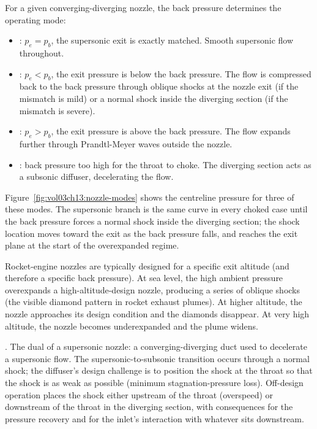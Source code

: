 

For a given converging-diverging nozzle, the back pressure
determines the operating mode:

\begin{itemize}[leftmargin=*]
  \item {}: $p_e = p_b$, the supersonic
    exit is exactly matched. Smooth supersonic flow throughout.
  \item {}: $p_e < p_b$, the exit pressure is
    below the back pressure. The flow is compressed back to the
    back pressure through oblique shocks at the nozzle exit (if
    the mismatch is mild) or a normal shock inside the diverging
    section (if the mismatch is severe).
  \item {}: $p_e > p_b$, the exit pressure is
    above the back pressure. The flow expands further through
    Prandtl-Meyer waves outside the nozzle.
  \item {}: back pressure too high for
    the throat to choke. The diverging section acts as a
    subsonic diffuser, decelerating the flow.
\end{itemize}



Figure~\ref{fig:vol03ch13:nozzle-modes} shows the centreline pressure
for three of these modes. The supersonic branch is the same curve in
every choked case until the back pressure forces a normal shock inside
the diverging section; the shock location moves toward the exit as the
back pressure falls, and reaches the exit plane at the start of the
overexpanded regime.

Rocket-engine nozzles are typically designed for a specific exit
altitude (and therefore a specific back pressure). At sea level,
the high ambient pressure overexpands a high-altitude-design
nozzle, producing a series of oblique shocks (the visible diamond
pattern in rocket exhaust plumes). At higher altitude, the
nozzle approaches its design condition and the diamonds
disappear. At very high altitude, the nozzle becomes underexpanded
and the plume widens.

. The dual of a supersonic nozzle: a
converging-diverging duct used to decelerate a supersonic flow.
The supersonic-to-subsonic transition occurs through a normal
shock; the diffuser's design challenge is to position the shock
at the throat so that the shock is as weak as possible (minimum
stagnation-pressure loss). Off-design operation places the shock
either upstream of the throat (overspeed) or downstream of the
throat in the diverging section, with consequences for the
pressure recovery and for the inlet's interaction with whatever
sits downstream.

